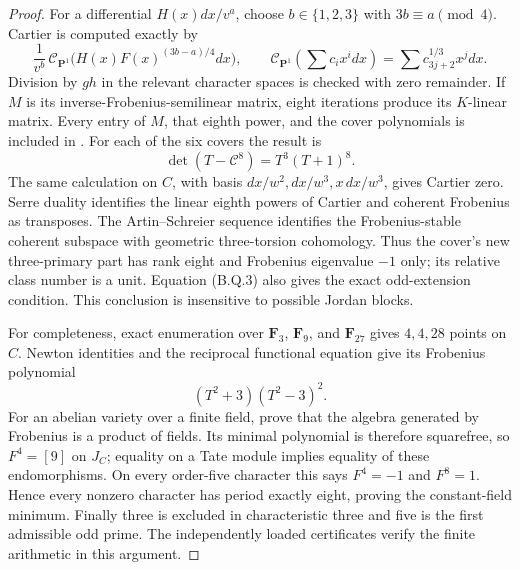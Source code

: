 \documentclass[11pt,a4paper]{article}
\begin{document}
\begin{proof}
For a differential $H(x)dx/v^a$, choose $b\in\{1,2,3\}$
with $3b\equiv a\pmod4$. Cartier is computed exactly by
\[
 \frac{1}{v^b}\,\mathcal C_{\mathbf P^1}
       \bigl(H(x)F(x)^{(3b-a)/4}dx\bigr),\qquad
 \mathcal C_{\mathbf P^1}\left(\sum c_ix^i dx\right)
       =\sum c_{3j+2}^{1/3}x^jdx.
\]
Division by $gh$ in the relevant character spaces is checked
with zero remainder. If $M$ is its inverse-Frobenius-semilinear
matrix, eight iterations produce its $K$-linear matrix. Every
entry of $M$, that eighth power, and the cover polynomials is
included in . For each of the
six covers the result is
\[
     \det(T-\mathcal C^8)=T^3(T+1)^8.                 \tag{B.Q.3}
\]
The same calculation on $C$, with basis
$dx/w^2,dx/w^3,x\,dx/w^3$, gives Cartier zero.
Serre duality identifies the linear eighth powers of Cartier
and coherent Frobenius as transposes. The Artin--Schreier
sequence identifies the Frobenius-stable coherent subspace
with geometric three-torsion cohomology. Thus the cover's
new three-primary part has rank eight and Frobenius eigenvalue
$-1$ only; its relative class number is a unit. Equation
(B.Q.3) also gives the exact odd-extension condition. This
conclusion is insensitive to possible Jordan blocks.

For completeness, exact enumeration over $\mathbf F_3$,
$\mathbf F_9$, and $\mathbf F_{27}$ gives $4,4,28$ points
on $C$. Newton identities and the reciprocal functional
equation give its Frobenius polynomial
\[
                     (T^2+3)(T^2-3)^2.
\]
For an abelian variety over a finite field,
\citep[Chapter~II, Lemma~1.3 and Remark~1.4]{MilneAV2008}
prove that the algebra generated by Frobenius is a product
of fields. Its minimal polynomial is therefore squarefree,
so $F^4=[9]$ on $J_C$;
equality on a Tate module implies equality of these
endomorphisms. On every order-five character this says
$F^4=-1$ and $F^8=1$. Hence every nonzero character has
period exactly eight, proving the constant-field minimum.
Finally three is excluded in characteristic three and five
is the first admissible odd prime. The independently loaded
certificates verify the finite arithmetic in this argument.
\end{proof}
\end{document}
